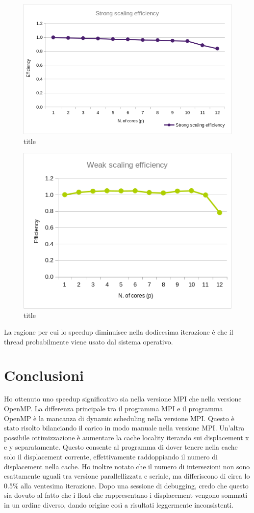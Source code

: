 \documentclass[a4paper,11pt, twoside]{report}
\begin{document}
\begin{figure}
    \includegraphics[scale=0.5]{images/mpi_strong.png}
    \caption[short]{title}
\end{figure}
\begin{figure}
    \includegraphics[scale=0.5]{images/mpi_weak.png}
    \caption[short]{title} 
\end{figure}
\newline
La ragione per cui lo speedup diminuisce nella dodicesima iterazione è che il thread probabilmente viene usato dal sistema operativo.
\section*{Conclusioni}
Ho ottenuto uno speedup significativo sia nella versione MPI che nella versione OpenMP.
La differenza principale tra il programma MPI e il programma OpenMP è la mancanza di dynamic scheduling nella versione MPI.
Questo è stato risolto bilanciando il carico in modo manuale nella versione MPI.
Un'altra possibile ottimizzazione è aumentare la cache locality iterando sui displacement x e y separatamente.
Questo consente al programma di dover tenere nella cache solo il displacement corrente, effettivamente raddoppiando il numero di displacement nella cache.
Ho inoltre notato che il numero di intersezioni non sono esattamente uguali tra versione parallellizzata e seriale, ma differiscono di circa lo 0.5\% alla ventesima iterazione.
Dopo una sessione di debugging, credo che questo sia dovuto al fatto che i float che rappresentano i displacement vengono sommati in un ordine diverso, dando origine così a risultati leggermente inconsistenti.
\end{document}
